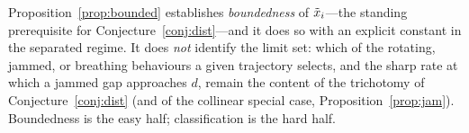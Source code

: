 \begin{remark}\label{rem:bounded_scope}
Proposition~\ref{prop:bounded} establishes \emph{boundedness} of $\tilde{x}_i$---the standing prerequisite
for Conjecture~\ref{conj:dist}---and it does so with an explicit constant in the separated regime.
It does \emph{not} identify the limit set: which of the rotating, jammed, or breathing behaviours a
given trajectory selects, and the sharp rate at which a jammed gap approaches $d$, remain the content
of the trichotomy of Conjecture~\ref{conj:dist} (and of the collinear special case,
Proposition~\ref{prop:jam}). Boundedness is the easy half; classification is the hard half.
\end{remark}
